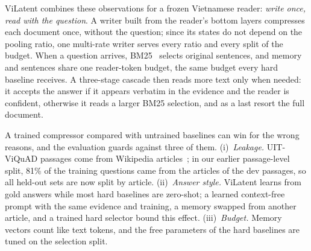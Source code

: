 ViLatent combines these observations for a frozen Vietnamese reader: \emph{write once, read with the question}.
A writer built from the reader's bottom layers compresses each document once, without the question; since its states do not depend on the pooling ratio, one multi-rate writer serves every ratio and every split of the budget.
When a question arrives, BM25~\cite{robertson2009bm25} selects original sentences, and memory and sentences share one reader-token budget, the same budget every hard baseline receives.
A three-stage cascade then reads more text only when needed: it accepts the answer if it appears verbatim in the evidence and the reader is confident, otherwise it reads a larger BM25 selection, and as a last resort the full document.

A trained compressor compared with untrained baselines can win for the wrong reasons, and the evaluation guards against three of them.
(i)~\emph{Leakage.} UIT-ViQuAD passages come from Wikipedia articles~\cite{nguyen2020viquad,nguyen2022vlsp}; in our earlier passage-level split, 81\% of the training questions came from the articles of the dev passages, so all held-out sets are now split by article.
(ii)~\emph{Answer style.} ViLatent learns from gold answers while most hard baselines are zero-shot; a learned context-free prompt with the same evidence and training, a memory swapped from another article, and a trained hard selector bound this effect.
(iii)~\emph{Budget.} Memory vectors count like text tokens, and the free parameters of the hard baselines are tuned on the selection split.

